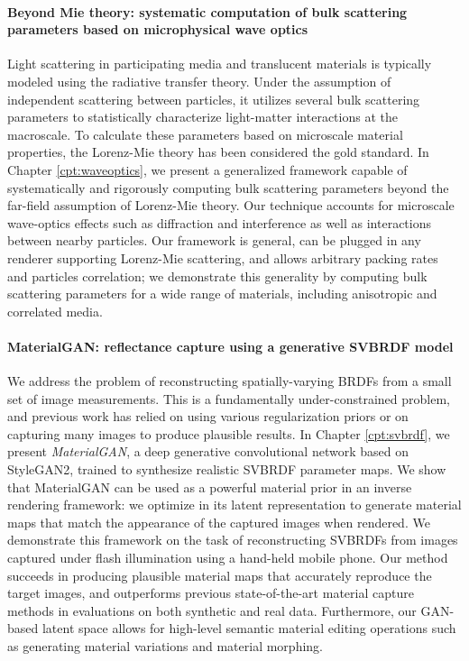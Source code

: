 \paragraph{Beyond Mie theory: systematic computation of bulk scattering parameters based on microphysical wave optics}
Light scattering in participating media and translucent materials is typically modeled using the radiative transfer theory. Under the assumption of independent scattering between particles, it utilizes several bulk scattering parameters to statistically characterize light-matter interactions at the macroscale. To calculate these parameters based on microscale material properties, the Lorenz-Mie theory has been considered the gold standard.
In Chapter \ref{cpt:waveoptics}, we present a generalized framework capable of systematically and rigorously computing bulk scattering parameters beyond the far-field assumption of Lorenz-Mie theory. Our technique accounts for microscale wave-optics effects such as diffraction and interference as well as interactions between nearby particles. Our framework is general, can be plugged in any renderer supporting Lorenz-Mie scattering, and allows arbitrary packing rates and particles correlation; we demonstrate this generality by computing bulk scattering parameters for a wide range of materials, including anisotropic and correlated media.

\paragraph{MaterialGAN: reflectance capture using a generative SVBRDF model}
We address the problem of reconstructing spatially-varying BRDFs from a small set of image measurements. This is a fundamentally under-constrained problem, and previous work has relied on using various regularization priors or on capturing many images to produce plausible results.
In Chapter \ref{cpt:svbrdf}, we present \emph{MaterialGAN}, a deep generative convolutional network based on StyleGAN2, trained to synthesize realistic SVBRDF parameter maps. We show that MaterialGAN can be used as a powerful material prior in an inverse rendering framework: we optimize in its latent representation to generate material maps that match the appearance of the captured images when rendered. We demonstrate this framework on the task of reconstructing SVBRDFs from images captured under flash illumination using a hand-held mobile phone. Our method succeeds in producing plausible material maps that accurately reproduce the target images, and outperforms previous state-of-the-art material capture methods in evaluations on both synthetic and real data. Furthermore, our GAN-based latent space allows for high-level semantic material editing operations such as generating material variations and material morphing.

